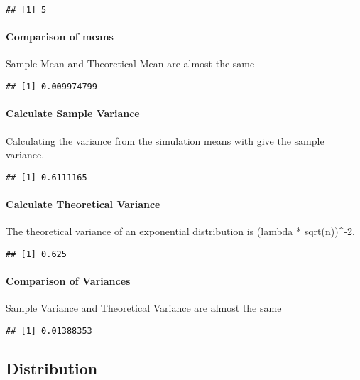 \documentclass[
]{article}
\begin{document}
\begin{verbatim}
## [1] 5
\end{verbatim}

\hypertarget{comparison-of-means}{%
\paragraph{Comparison of means}\label{comparison-of-means}}

Sample Mean and Theoretical Mean are almost the same

\begin{verbatim}
## [1] 0.009974799
\end{verbatim}

\hypertarget{calculate-sample-variance}{%
\paragraph{Calculate Sample Variance}\label{calculate-sample-variance}}

Calculating the variance from the simulation means with give the sample
variance.

\begin{verbatim}
## [1] 0.6111165
\end{verbatim}

\hypertarget{calculate-theoretical-variance}{%
\paragraph{Calculate Theoretical
Variance}\label{calculate-theoretical-variance}}

The theoretical variance of an exponential distribution is (lambda *
sqrt(n))\^{}-2.

\begin{verbatim}
## [1] 0.625
\end{verbatim}

\hypertarget{comparison-of-variances}{%
\paragraph{Comparison of Variances}\label{comparison-of-variances}}

Sample Variance and Theoretical Variance are almost the same

\begin{verbatim}
## [1] 0.01388353
\end{verbatim}

\hypertarget{distribution}{%
\subsection{Distribution}\label{distribution}}
\end{document}

